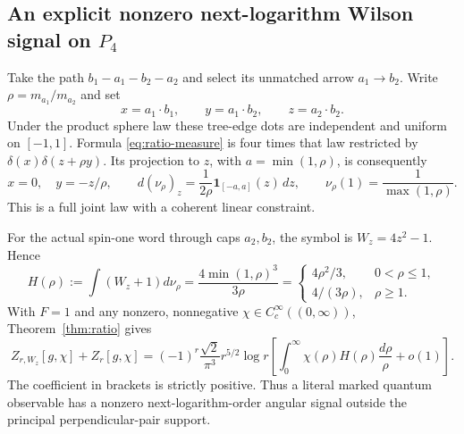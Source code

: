 \subsection{An explicit nonzero next-logarithm Wilson signal on \texorpdfstring{$P_4$}{P4}}
Take the path $b_1-a_1-b_2-a_2$ and select its unmatched arrow
$a_1\to b_2$. Write $\rho=m_{a_1}/m_{a_2}$ and set
\[
 x=a_1\cdot b_1,\qquad y=a_1\cdot b_2,\qquad z=a_2\cdot b_2.
\]
Under the product sphere law these tree-edge dots are independent
and uniform on $[-1,1]$. Formula \eqref{eq:ratio-measure} is four
times that law restricted by $\delta(x)\delta(z+\rho y)$.
Its projection to $z$, with $a=\min(1,\rho)$, is consequently
\begin{equation}\label{eq:ratio-p4-law}
 x=0,\quad y=-z/\rho,\qquad
 d(\nu_\rho)_z=\frac1{2\rho}\mathbf1_{[-a,a]}(z)\,dz,
 \qquad \nu_\rho(1)=\frac1{\max(1,\rho)}.
\end{equation}
This is a full joint law with a coherent linear constraint.

For the actual spin-one word through caps $a_2,b_2$, the symbol is
$W_z=4z^2-1$. Hence
\[
 H(\rho):=\int(W_z+1)d\nu_\rho
 =\frac{4\min(1,\rho)^3}{3\rho}
 =\begin{cases}4\rho^2/3,&0<\rho\le1,\\
                 4/(3\rho),&\rho\ge1.
   \end{cases}
\]
With $F=1$ and any nonzero, nonnegative
$\chi\in C_c^\infty((0,\infty))$, Theorem~\ref{thm:ratio} gives
\begin{equation}\label{eq:ratio-nonzero}
 Z_{r,W_z}[g,\chi]+Z_r[g,\chi]
 =(-1)^r\frac{\sqrt2}{\pi^3}r^{5/2}\log r
   \left[\int_0^\infty\chi(\rho)H(\rho)\frac{d\rho}{\rho}
           +o(1)\right].
\end{equation}
The coefficient in brackets is strictly positive. Thus a literal
marked quantum observable has a nonzero next-logarithm-order angular
signal outside the principal perpendicular-pair support.

